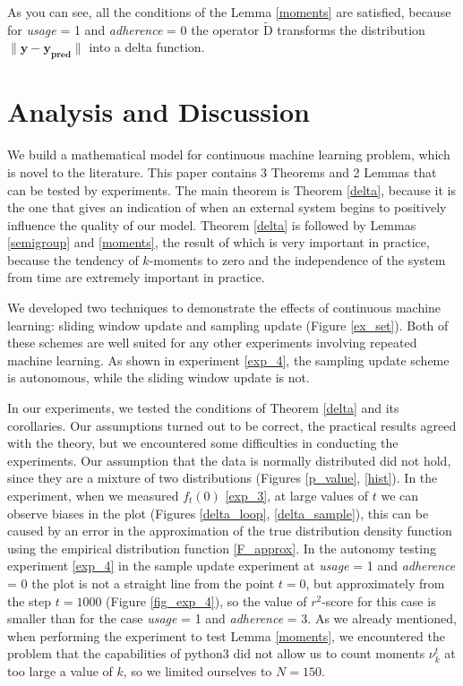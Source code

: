 \documentclass{article}
\begin{document}
        As you can see, all the conditions of the Lemma \ref{moments} are satisfied, because for \textit{usage} = 1 and \textit{adherence} = 0 the operator $\widetilde{\text{D}}$ transforms the distribution $\|\mathbf{y} - \mathbf{y_{\text{pred}}}\|$ into a delta function.


    \section{Analysis and Discussion}
    
        We build a mathematical model for continuous machine learning problem, which is novel to the literature. This paper contains 3 Theorems and 2 Lemmas that can be tested by experiments. The main theorem is Theorem \ref{delta}, because it is the one that gives an indication of when an external system begins to positively influence the quality of our model. Theorem \ref{delta} is followed by Lemmas \ref{semigroup} and \ref{moments}, the result of which is very important in practice, because the tendency of $k$-moments to zero and the independence of the system from time are extremely important in practice.

        We developed two techniques to demonstrate the effects of continuous machine learning: sliding window update and sampling update (Figure \ref{ex_set}). Both of these schemes are well suited for any other experiments involving repeated machine learning. As shown in experiment \ref{exp_4}, the sampling update scheme is autonomous, while the sliding window update is not.

        In our experiments, we tested the conditions of Theorem \ref{delta} and its corollaries. Our assumptions turned out to be correct, the practical results agreed with the theory, but we encountered some difficulties in conducting the experiments. Our assumption that the data is normally distributed did not hold, since they are a mixture of two distributions (Figures \ref{p_value}, \ref{hist}). In the experiment, when we measured $f_t(0)$ \ref{exp_3}, at large values of $t$ we can observe biases in the plot (Figures \ref{delta_loop}, \ref{delta_sample}), this can be caused by an error in the approximation of the true distribution density function using the empirical distribution function \eqref{F_approx}. In the autonomy testing experiment \ref{exp_4} in the sample update experiment at \textit{usage} = 1 and \textit{adherence} = 0 the plot is not a straight line from the point $t = 0$, but approximately from the step $t = 1000$ (Figure \ref{fig_exp_4}), so the value of $r^2$-score for this case is smaller than for the case \textit{usage} = 1 and \textit{adherence} = 3. As we already mentioned, when performing the experiment to test Lemma \ref{moments}, we encountered the problem that the capabilities of python3 did not allow us to count moments $\nu_k^t$ at too large a value of $k$, so we limited ourselves to $N = 150$.
\end{document}

